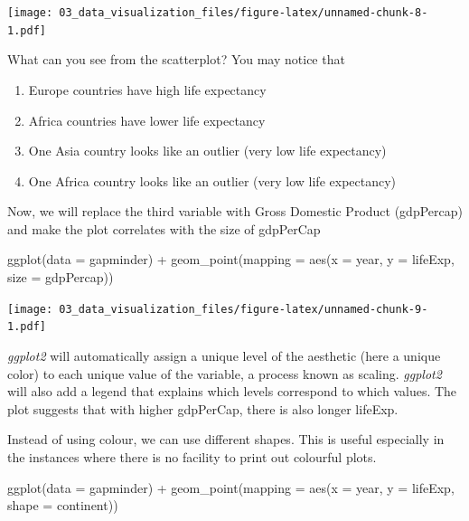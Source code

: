 \documentclass[
  10pt,
]{krantz}
\newenvironment{Shaded}{\begin{snugshade}}{\end{snugshade}}
\newcommand{\AttributeTok}[1]{\textcolor[rgb]{0.77,0.63,0.00}{#1}}
\newcommand{\FunctionTok}[1]{\textcolor[rgb]{0.00,0.00,0.00}{#1}}
\newcommand{\NormalTok}[1]{#1}
\newcommand{\SpecialCharTok}[1]{\textcolor[rgb]{0.00,0.00,0.00}{#1}}
\providecommand{\tightlist}{%
  \setlength{\itemsep}{0pt}\setlength{\parskip}{0pt}}
\begin{document}
\texttt{[image: 03\_data\_visualization\_files/figure-latex/unnamed-chunk-8-1.pdf]}

What can you see from the scatterplot? You may notice that

\begin{enumerate}
\def\labelenumi{\arabic{enumi}.}
\tightlist
\item
  Europe countries have high life expectancy
\item
  Africa countries have lower life expectancy
\item
  One Asia country looks like an outlier (very low life expectancy)
\item
  One Africa country looks like an outlier (very low life expectancy)
\end{enumerate}

Now, we will replace the third variable with Gross Domestic Product (gdpPercap) and make the plot correlates with the size of gdpPerCap

\begin{Shaded}
\begin{Highlighting}[]
\FunctionTok{ggplot}\NormalTok{(}\AttributeTok{data =}\NormalTok{ gapminder) }\SpecialCharTok{+}
  \FunctionTok{geom\_point}\NormalTok{(}\AttributeTok{mapping =} \FunctionTok{aes}\NormalTok{(}\AttributeTok{x =}\NormalTok{ year, }
                           \AttributeTok{y =}\NormalTok{ lifeExp, }
                           \AttributeTok{size =}\NormalTok{ gdpPercap))}
\end{Highlighting}
\end{Shaded}

\texttt{[image: 03\_data\_visualization\_files/figure-latex/unnamed-chunk-9-1.pdf]}

\emph{ggplot2} will automatically assign a unique level of the aesthetic (here a unique color) to each unique value of the variable, a process known as scaling. \emph{ggplot2} will also add a legend that explains which levels correspond to which values. The plot suggests that with higher gdpPerCap, there is also longer lifeExp.

Instead of using colour, we can use different shapes. This is useful especially in the instances where there is no facility to print out colourful plots.

\begin{Shaded}
\begin{Highlighting}[]
\FunctionTok{ggplot}\NormalTok{(}\AttributeTok{data =}\NormalTok{ gapminder) }\SpecialCharTok{+}
  \FunctionTok{geom\_point}\NormalTok{(}\AttributeTok{mapping =} \FunctionTok{aes}\NormalTok{(}\AttributeTok{x =}\NormalTok{ year, }
                           \AttributeTok{y =}\NormalTok{ lifeExp, }
                           \AttributeTok{shape =}\NormalTok{ continent))}
\end{Highlighting}
\end{Shaded}
\end{document}
